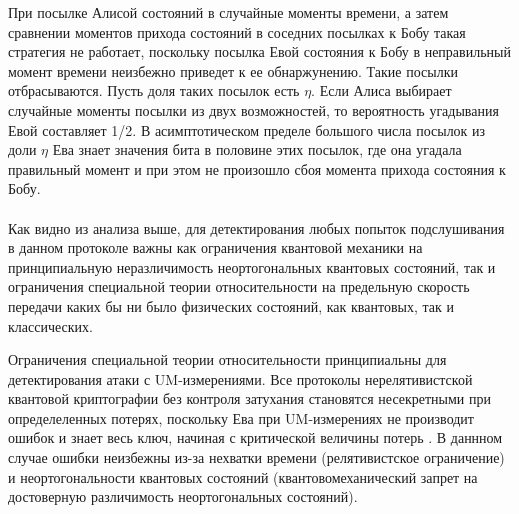 При посылке Алисой состояний в случайные моменты времени, а затем сравнении моментов прихода состояний в соседних посылках к Бобу такая стратегия не работает, поскольку посылка Евой состояния к Бобу в неправильный момент времени неизбежно приведет к ее обнаржунению. 
Такие посылки отбрасываются. Пусть доля таких посылок есть $\eta$. Если Алиса выбирает случайные моменты посылки из двух возможностей, то вероятность угадывания Евой составляет 1/2. В асимптотическом пределе большого числа посылок из доли $\eta$ Ева знает значения бита в половине этих посылок, где она угадала правильный момент и при этом не произошло сбоя момента прихода состояния к Бобу.

\paragraph{}
Как видно из анализа выше, для детектирования любых попыток подслушивания в данном протоколе важны как ограничения квантовой механики на принципиальную неразличимость неортогональных квантовых состояний, так и ограничения специальной теории относительности на предельную скорость передачи каких бы ни было физических состояний, как квантовых, так и классических.

Ограничения специальной теории относительности принципиальны для детектирования атаки с UM-измерениями. Все протоколы нерелятивистской квантовой криптографии без контроля затухания становятся несекретными при определеленных потерях, поскольку Ева при UM-измерениях не производит ошибок и знает весь ключ, начиная с критической величины потерь \cite{scarani2009secpraquakeydis}. В даннном случае ошибки неизбежны из-за нехватки времени (релятивистское ограничение) и неортогональности квантовых состояний (квантовомеханический запрет на достоверную различимость неортогональных состояний).
\clearpage